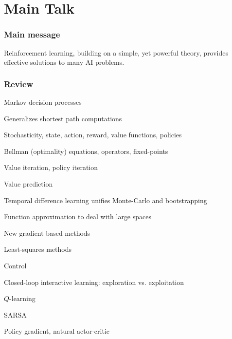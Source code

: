 
\part<presentation>{Main Talk}

\section{Main message}
{
\begin{alertblock}{}
\bigskip
Reinforcement learning, building on a simple, yet powerful theory,
 provides effective solutions to many AI problems.
\bigskip
\end{alertblock}
}

\section{Review}
{
\bi
\item Markov decision processes
\bi
\item Generalizes shortest path computations
\item Stochasticity, state, action, reward, value functions, policies
\item Bellman (optimality) equations, operators, fixed-points
\item Value iteration, policy iteration
\ei
\item Value prediction
\bi
\item Temporal difference learning unifies Monte-Carlo and bootstrapping
\item Function approximation to deal with large spaces
\item New gradient based methods %
\item Least-squares methods
\ei
\item Control
\bi
\item Closed-loop interactive learning: exploration vs. exploitation
\item $Q$-learning
\item SARSA
\item Policy gradient, natural actor-critic
\ei
\ei
}

